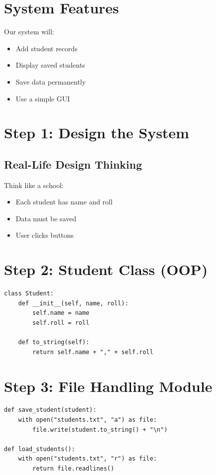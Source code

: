 \section{System Features}

Our system will:
\begin{itemize}
    \item Add student records
    \item Display saved students
    \item Save data permanently
    \item Use a simple GUI
\end{itemize}

\section{Step 1: Design the System}

\subsection{Real-Life Design Thinking}

Think like a school:
\begin{itemize}
    \item Each student has name and roll
    \item Data must be saved
    \item User clicks buttons
\end{itemize}

\section{Step 2: Student Class (OOP)}

\begin{verbatim}
class Student:
    def __init__(self, name, roll):
        self.name = name
        self.roll = roll

    def to_string(self):
        return self.name + "," + self.roll
\end{verbatim}

\section{Step 3: File Handling Module}

\begin{verbatim}
def save_student(student):
    with open("students.txt", "a") as file:
        file.write(student.to_string() + "\n")

def load_students():
    with open("students.txt", "r") as file:
        return file.readlines()
\end{verbatim}

